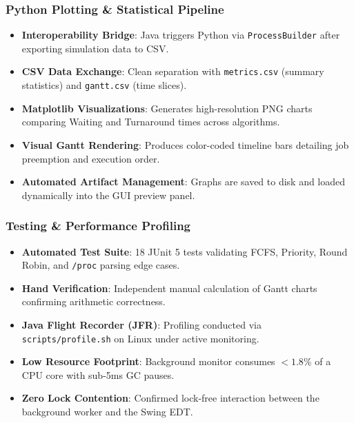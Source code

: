 \documentclass[aspectratio=169,10pt]{beamer}
\begin{document}
\begin{frame}
  \frametitle{Python Plotting \& Statistical Pipeline}
  \begin{itemize}
    \item \textbf{Interoperability Bridge}: Java triggers Python via \texttt{ProcessBuilder} after exporting simulation data to CSV.
    \item \textbf{CSV Data Exchange}: Clean separation with \texttt{metrics.csv} (summary statistics) and \texttt{gantt.csv} (time slices).
    \item \textbf{Matplotlib Visualizations}: Generates high-resolution PNG charts comparing Waiting and Turnaround times across algorithms.
    \item \textbf{Visual Gantt Rendering}: Produces color-coded timeline bars detailing job preemption and execution order.
    \item \textbf{Automated Artifact Management}: Graphs are saved to disk and loaded dynamically into the GUI preview panel.
  \end{itemize}
\end{frame}

\begin{frame}
  \frametitle{Testing \& Performance Profiling}
  \begin{itemize}
    \item \textbf{Automated Test Suite}: 18 JUnit 5 tests validating FCFS, Priority, Round Robin, and \texttt{/proc} parsing edge cases.
    \item \textbf{Hand Verification}: Independent manual calculation of Gantt charts confirming arithmetic correctness.
    \item \textbf{Java Flight Recorder (JFR)}: Profiling conducted via \texttt{scripts/profile.sh} on Linux under active monitoring.
    \item \textbf{Low Resource Footprint}: Background monitor consumes $< 1.8\%$ of a CPU core with sub-5ms GC pauses.
    \item \textbf{Zero Lock Contention}: Confirmed lock-free interaction between the background worker and the Swing EDT.
  \end{itemize}
\end{frame}
\end{document}
